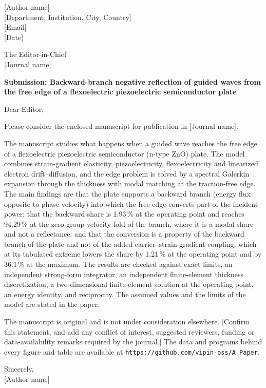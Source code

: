 \documentclass[11pt,a4paper]{article}
\begin{document}
[Author name]\\[0pt] [Department, Institution, City, Country]\\[0pt] [Email]\\[0pt] [Date]

The Editor-in-Chief\\[0pt] [Journal name]

\textbf{Submission: Backward-branch negative reflection of guided waves from the free edge of a flexoelectric piezoelectric semiconductor plate}

Dear Editor,

Please consider the enclosed manuscript for publication in [Journal name].

The manuscript studies what happens when a guided wave reaches the free edge of a flexoelectric piezoelectric semiconductor (n-type ZnO) plate. The model combines strain-gradient elasticity, piezoelectricity, flexoelectricity and linearized electron drift--diffusion, and the edge problem is solved by a spectral Galerkin expansion through the thickness with modal matching at the traction-free edge. The main findings are that the plate supports a backward branch (energy flux opposite to phase velocity) into which the free edge converts part of the incident power; that the backward share is 1.93\,\% at the operating point and reaches 94.29\,\% at the zero-group-velocity fold of the branch, where it is a modal share and not a reflectance; and that the conversion is a property of the backward branch of the plate and not of the added carrier--strain-gradient coupling, which at its tabulated extreme lowers the share by 1.21\,\% at the operating point and by 36.1\,\% at the maximum. The results are checked against exact limits, an independent strong-form integrator, an independent finite-element thickness discretization, a two-dimensional finite-element solution at the operating point, an energy identity, and reciprocity. The assumed values and the limits of the model are stated in the paper.

The manuscript is original and is not under consideration elsewhere. [Confirm this statement, and add any conflict of interest, suggested reviewers, funding or data-availability remarks required by the journal.] The data and programs behind every figure and table are available at \texttt{https://github.com/vipin-oss/A\_Paper}.

Sincerely,\\[4pt]
[Author name]
\end{document}
